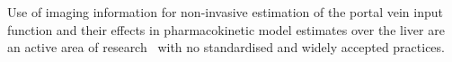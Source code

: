 Use of imaging information for non-invasive estimation of the portal vein input function and their effects in pharmacokinetic model estimates over the liver are an active area of research~\cite{Wang2018,HernandezLozano2019} with no standardised and widely accepted practices.


